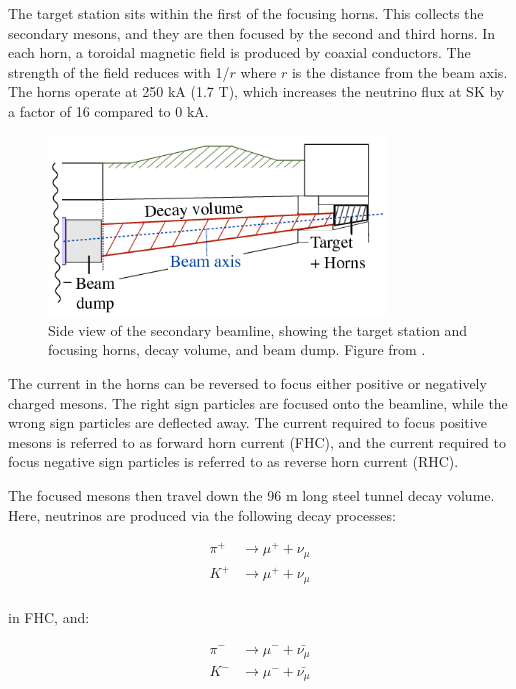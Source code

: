 The target station sits within the first of the focusing horns. This collects the secondary mesons, and they are then focused by the second and third horns. In each horn, a toroidal magnetic field is produced by coaxial conductors. The strength of the field reduces with 1/$r$ where $r$ is the distance from the beam axis. The horns operate at 250 kA (1.7 T), which increases the neutrino flux at SK by a factor of 16 compared to 0 kA. 

\begin{figure}[!htbp]
\centering
\includegraphics*[width=0.8\textwidth,clip]{figs/secondarybeamline}
\caption{Side view of the secondary beamline, showing the target station and focusing horns, decay volume, and beam dump. Figure from \cite{decayhorns}.} \label{secondarybeamline}
\end{figure}

The current in the horns can be reversed to focus either positive or negatively charged mesons. The right sign particles are focused onto the beamline, while the wrong sign particles are deflected away. The current required to focus positive mesons is referred to as forward horn current (FHC), and the current required to focus negative sign particles is referred to as reverse horn current (RHC). 

The focused mesons then travel down the 96 m long steel tunnel decay volume. Here, neutrinos are produced via the following decay processes: 

\begin{equation}
 \begin{aligned}
\pi^{+} &\rightarrow \mu^{+} + \nu_{\mu}\\
K^{+} &\rightarrow \mu^{+} + \nu_{\mu}\\
\end{aligned}
\end{equation}

in FHC, and:

\begin{equation}
\begin{aligned}
\pi^{-} &\rightarrow \mu^{-} + \bar{\nu_{\mu}}\\
K^{-} &\rightarrow \mu^{-} + \bar{\nu_{\mu}}\\
 \end{aligned}
\label{eqn:mesondecay}
\end{equation}

